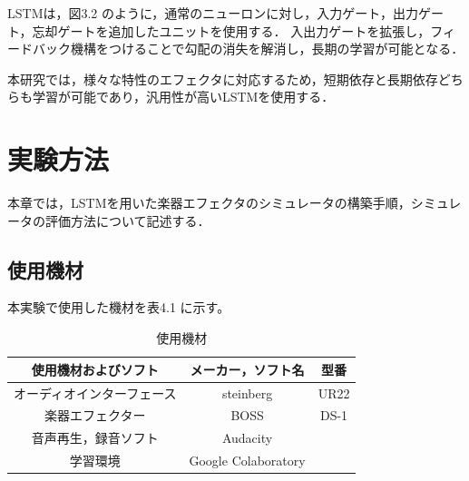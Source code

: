 \documentclass{jreport}		%
\begin{document}
LSTMは，図3.2 のように，通常のニューロンに対し，入力ゲート，出力ゲート，忘却ゲートを追加したユニットを使用する．
入出力ゲートを拡張し，フィードバック機構をつけることで勾配の消失を解消し，長期の学習が可能となる．\cite{RNN}

本研究では，様々な特性のエフェクタに対応するため，短期依存と長期依存どちらも学習が可能であり，汎用性が高いLSTMを使用する．

\chapter{実験方法}
本章では，LSTMを用いた楽器エフェクタのシミュレータの構築手順，シミュレータの評価方法について記述する．

\section{使用機材}
本実験で使用した機材を表4.1 に示す。
\begin{table}[h]
  \begin{center}
  \caption{使用機材}
  \begin{tabular}{c|cc} \hline
使用機材およびソフト&メーカー，ソフト名&型番 \\ \hline
    オーディオインターフェース&steinberg&UR22 \\
    楽器エフェクター&BOSS&DS-1\\
    音声再生，録音ソフト&Audacity& \\
    学習環境&Google Colaboratory& \\ \hline
  \end{tabular}
 \end{center}
\end{table}
\end{document}
